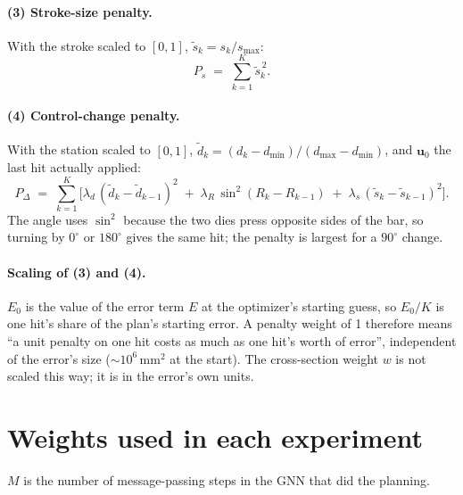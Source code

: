 \documentclass[11pt]{article}
\begin{document}
\paragraph{(3) Stroke-size penalty.}
With the stroke scaled to $[0, 1]$, $\tilde{s}_k = s_k / s_{\max}$:
\begin{equation}
  P_{s} \;=\; \sum_{k=1}^{K} \tilde{s}_k^{\,2}.
\end{equation}

\paragraph{(4) Control-change penalty.}
With the station scaled to $[0, 1]$,
$\tilde{d}_k = (d_k - d_{\min}) / (d_{\max} - d_{\min})$, and $\mathbf{u}_0$ the
last hit actually applied:
\begin{equation}
  P_{\Delta} \;=\; \sum_{k=1}^{K} \Big[
    \lambda_d \,(\tilde{d}_k - \tilde{d}_{k-1})^{2}
    \;+\; \lambda_R \,\sin^{2}\!\left(R_k - R_{k-1}\right)
    \;+\; \lambda_s \,(\tilde{s}_k - \tilde{s}_{k-1})^{2}
  \Big].
\end{equation}
The angle uses $\sin^2$ because the two dies press opposite sides of the bar,
so turning by $0^\circ$ or $180^\circ$ gives the same hit; the penalty is
largest for a $90^\circ$ change.

\paragraph{Scaling of (3) and (4).}
$E_0$ is the value of the error term $E$ at the optimizer's starting guess, so
$E_0 / K$ is one hit's share of the plan's starting error. A penalty weight of
1 therefore means ``a unit penalty on one hit costs as much as one hit's worth
of error'', independent of the error's size ($\sim\!10^{6}$\,mm$^2$ at the
start). The cross-section weight $w$ is not scaled this way; it is in the
error's own units.

\section{Weights used in each experiment}

$M$ is the number of message-passing steps in the GNN that did the planning.
\end{document}
